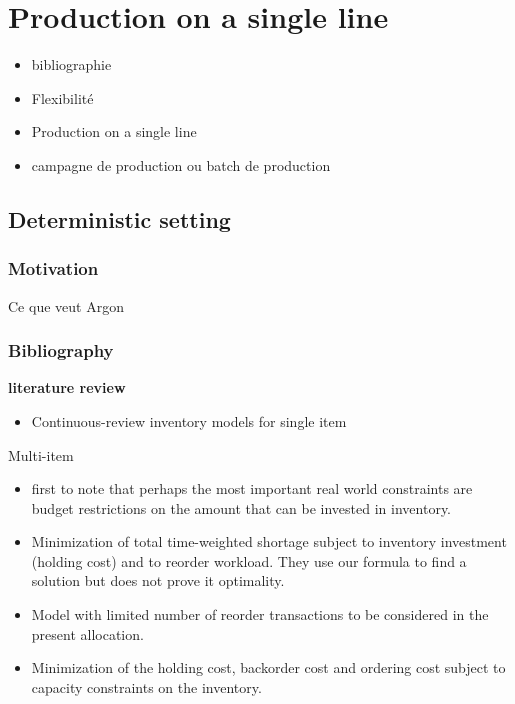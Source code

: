 \chapter{Production on a single line}
\label{chap:lot-size on single line}


\begin{itemize}
  \item bibliographie
  \item Flexibilité
  \item Production on a single line
  \item campagne de production ou batch de production
\end{itemize}



\section{Deterministic setting}

\subsection{Motivation}

Ce que veut Argon

\subsection{Bibliography}

\textbf{literature review}

\begin{itemize}
   \item \cite{Gayon2016} Continuous-review inventory models for single item
\end{itemize} 

Multi-item

\begin{itemize}
  \item \cite{Hadley1963} first to note that perhaps the most important real world constraints are budget restrictions on the amount that can be invested in inventory.
  \item \cite{Schrady1971} Minimization of total time-weighted shortage subject to inventory investment (holding cost) and to reorder workload. They use our formula to find a solution but does not prove it optimality.
  \item \cite{Daeschner1975} Model with limited number of reorder transactions to be considered in the present allocation.
  \item \cite{Ohno2001} Minimization of the holding cost, backorder cost and ordering cost subject to capacity constraints on the inventory.
\end{itemize}


